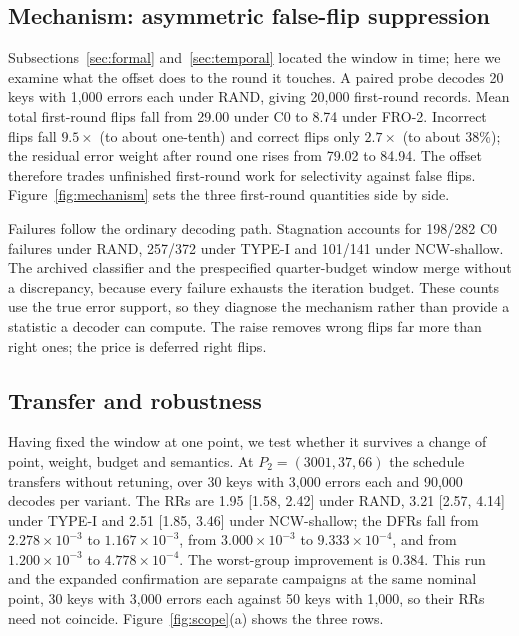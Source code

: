 \subsection{Mechanism: asymmetric false-flip suppression}\label{sec:mechanism}

Subsections~\ref{sec:formal} and~\ref{sec:temporal} located the window in time; here we examine what the offset does to the round it touches. A paired probe decodes 20 keys with 1{,}000 errors each under RAND, giving 20{,}000 first-round records. Mean total first-round flips fall from 29.00 under C0 to 8.74 under FRO-2. Incorrect flips fall $9.5\times$ (to about one-tenth) and correct flips only $2.7\times$ (to about 38\%); the residual error weight after round one rises from 79.02 to 84.94. The offset therefore trades unfinished first-round work for selectivity against false flips. Figure~\ref{fig:mechanism} sets the three first-round quantities side by side.

Failures follow the ordinary decoding path. Stagnation accounts for 198/282 C0 failures under RAND, 257/372 under TYPE-I and 101/141 under NCW-shallow. The archived classifier and the prespecified quarter-budget window merge without a discrepancy, because every failure exhausts the iteration budget. These counts use the true error support, so they diagnose the mechanism rather than provide a statistic a decoder can compute. The raise removes wrong flips far more than right ones; the price is deferred right flips.


\subsection{Transfer and robustness}\label{sec:transfer}

Having fixed the window at one point, we test whether it survives a change of point, weight, budget and semantics. At $P_2=(3001,37,66)$ the schedule transfers without retuning, over 30 keys with 3{,}000 errors each and 90{,}000 decodes per variant. The RRs are 1.95 [1.58, 2.42] under RAND, 3.21 [2.57, 4.14] under TYPE-I and 2.51 [1.85, 3.46] under NCW-shallow; the DFRs fall from $2.278\times10^{-3}$ to $1.167\times10^{-3}$, from $3.000\times10^{-3}$ to $9.333\times10^{-4}$, and from $1.200\times10^{-3}$ to $4.778\times10^{-4}$. The worst-group improvement is 0.384. This run and the expanded confirmation are separate campaigns at the same nominal point, 30 keys with 3{,}000 errors each against 50 keys with 1{,}000, so their RRs need not coincide. Figure~\ref{fig:scope}(a) shows the three rows.

